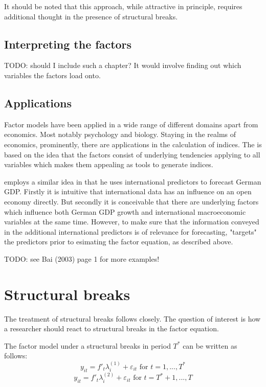 \documentclass[12pt]{article}
\begin{document}
It should be noted that this approach, while attractive in principle, requires additional thought in the presence of structural breaks.


\subsection{Interpreting the factors}
TODO: should I include such a chapter? It would involve finding out which variables the factors load onto.

\subsection{Applications}
Factor models have been applied in a wide range of different domains apart from economics. Most notably psychology and biology. Staying in the realms of economics, prominently, there are applications in the calculation of indices. The is based on the idea that the factors consist of underlying tendencies applying to all variables which makes them appealing as tools to generate indices.

\citet{schumacher2010factor} employs a similar idea in that he uses international predictors to forecast German GDP. Firstly it is intuitive that international data has an influence on an open economy directly. But secondly it is conceivable that there are underlying factors which influence both German GDP growth and international macroeconomic variables at the same time. However, to make sure that the information conveyed in the additional international predictors is of relevance for forecasting, \citet{schumacher2010factor} "targets" the predictors prior to esimating the factor equation, as described above.


TODO: see Bai (2003) page 1 for more examples!

\section{Structural breaks}
The treatment of structural breaks follows \citet{breitung2011testing} closely. The question of interest is how a researcher should react to structural breaks in the factor equation.

The factor model under a structural breaks in period $T^*$ can be written as follows:
\begin{equation}
	\label{}
	y_{it} = f'_t\lambda_i^{(1)} + \varepsilon_{it} \text{ for } t = 1, ..., T^*
\end{equation}
\begin{equation}
	\label{}
	y_{it} = f'_t\lambda_i^{(2)} + \varepsilon_{it} \text{ for } t = T^* + 1, ..., T
\end{equation}
\end{document}
